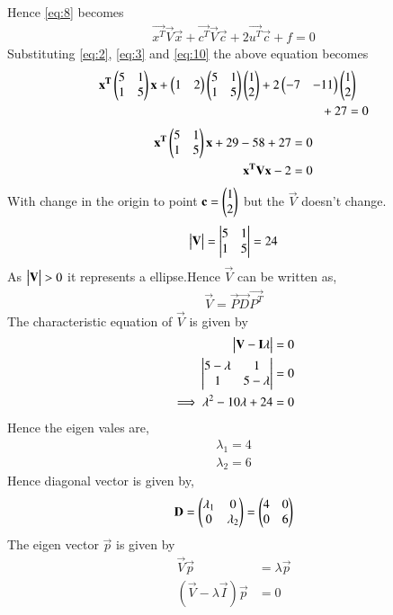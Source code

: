 \documentclass[journal,12pt,twocolumn]{IEEEtran}
\begin{document}
Hence \eqref{eq:8} becomes
\begin{align}
\vec{x^T}\vec{V}\vec{x}+\vec{c^T}\vec{V}\vec{c}+2\vec{u^T}\vec{c}+f = 0 \label{eq:11}
\end{align}
Substituting \eqref{eq:2}, \eqref{eq:3} and \eqref{eq:10} the above equation becomes
\begin{align}
\begin{multlined}
\vec{x^T}\myvec{5&1\\1&5}\vec{x}+\myvec{1&2}\myvec{5&1\\1&5}\myvec{1\\2}+2\myvec{-7&-11}\myvec{1\\2}\\+27 = 0
\end{multlined}
\end{align}
\begin{align}
\mathbf{x^T}\begin{pmatrix}5&1\\1&5\end{pmatrix}\mathbf{x}+29-58+27=0\\
\mathbf{x^T}\mathbf{V}\mathbf{x}-2 = 0\label{eq:12}
\end{align}
With change in the origin to point $\mathbf{c}=\begin{pmatrix}1\\2\end{pmatrix}$ but the $\vec{V}$ doesn't change.
\begin{align}
\begin{vmatrix}\mathbf{V}\end{vmatrix} = \begin{vmatrix}5&1\\1&5\end{vmatrix} = 24
\end{align}
As $\begin{vmatrix}\mathbf{V}\end{vmatrix} >0$ it represents a ellipse.Hence $\vec{V}$ can be written as,
\begin{align}
\vec{V}=\vec{P}\vec{D}\vec{P^T}\label{eq:13}
\end{align}
 The characteristic equation of $\vec{V}$ is given by
\begin{align}
\begin{vmatrix}\mathbf{V}-\mathbf{I}\lambda\end{vmatrix} = 0\\
\begin{vmatrix}5-\lambda & 1\\1& 5-\lambda\end{vmatrix} =0\\
\implies \lambda^2 - 10\lambda+24 = 0
\end{align}
Hence the eigen vales are,
\begin{align}
\lambda_1 = 4\\
\lambda_2 = 6
\end{align}
Hence diagonal vector is given by,
\begin{align}
\mathbf{D}= \begin{pmatrix}\lambda_1&0\\0&\lambda_2\end{pmatrix} = \begin{pmatrix}4&0\\0&6\end{pmatrix}\label{eq:14}
\end{align}
The eigen vector $\vec{p}$ is given by
\begin{align}
    \vec{V}\vec{p}&=\lambda\vec{p}\\
    (\vec{V}-\lambda\vec{I})\vec{p}&=0
\end{align}
\end{document}
